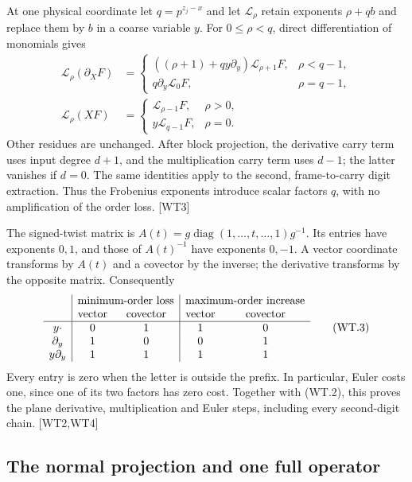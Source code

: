 \documentclass[11pt,a4paper]{article}
\numberwithin{equation}{section}
\theoremstyle{remark}\newtheorem{remark}[theorem]{Remark}
\begin{document}
At one physical coordinate let $q=p^{z_j-x}$ and let $\mathcal L_\rho$
retain exponents $\rho+qb$ and replace them by $b$ in a coarse variable $y$.
For $0\le\rho<q$, direct differentiation of monomials gives
\[
\begin{aligned}
 \mathcal L_\rho(\partial_X F)
 &=\begin{cases}
 ((\rho+1)+qy\partial_y)\mathcal L_{\rho+1}F,&\rho<q-1,\\
 q\partial_y\mathcal L_0F,&\rho=q-1,
 \end{cases}\\
 \mathcal L_\rho(XF)
 &=\begin{cases}
 \mathcal L_{\rho-1}F,&\rho>0,\\
 y\mathcal L_{q-1}F,&\rho=0.
 \end{cases}
\end{aligned}
\tag{WT.2}
\]
Other residues are unchanged. After block projection, the derivative
carry term uses input degree $d+1$, and the multiplication carry term
uses $d-1$; the latter vanishes if $d=0$.
The same identities apply to the second, frame-to-carry digit extraction.
Thus the Frobenius exponents introduce scalar factors $q$, with no
amplification of the order loss. \textsf{[WT3]}

The signed-twist matrix is
$A(t)=g\operatorname{diag}(1,\ldots,t,\ldots,1)g^{-1}$.
Its entries have exponents $0,1$, and those of $A(t)^{-1}$ have exponents
$0,-1$. A vector coordinate transforms by $A(t)$ and a covector by the
inverse; the derivative transforms by the opposite matrix. Consequently
\[
\begin{array}{c|cc|cc}
 &\multicolumn{2}{c|}{\text{minimum-order loss}}
 &\multicolumn{2}{c}{\text{maximum-order increase}}\\
 &\text{vector}&\text{covector}&\text{vector}&\text{covector}\\ \hline
 y\cdot&0&1&1&0\\
 \partial_y&1&0&0&1\\
 y\partial_y&1&1&1&1
\end{array}
\tag{WT.3}
\]
Every entry is zero when the letter is outside the prefix. In particular,
Euler costs one, since one of its two factors has zero cost.
Together with (WT.2), this proves the plane derivative, multiplication
and Euler steps, including every second-digit chain. \textsf{[WT2,WT4]}

\subsection{The normal projection and one full operator}
\end{document}
